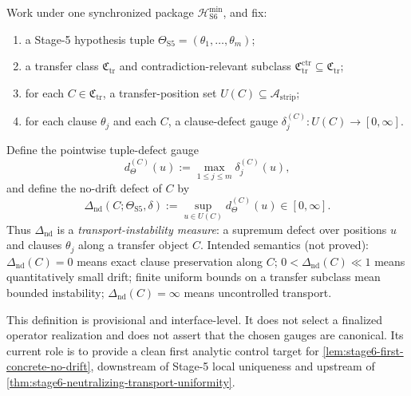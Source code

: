 \begin{definition}
Work under one synchronized package $\mathcal{H}_{\mathrm{S6}}^{\min}$, and fix:
\begin{enumerate}
  \item a Stage-5 hypothesis tuple $\Theta_{\mathrm{S5}}=(\theta_1,\dots,\theta_m)$;
  \item a transfer class $\mathfrak{C}_{\mathrm{tr}}$ and contradiction-relevant subclass
  $\mathfrak{C}_{\mathrm{tr}}^{\mathrm{ctr}}\subseteq\mathfrak{C}_{\mathrm{tr}}$;
  \item for each $C\in\mathfrak{C}_{\mathrm{tr}}$, a transfer-position set $U(C)\subseteq\mathcal{A}_{\mathrm{strip}}$;
  \item for each clause $\theta_j$ and each $C$, a clause-defect gauge
  $\delta_j^{(C)}:U(C)\to[0,\infty]$.
\end{enumerate}
Define the pointwise tuple-defect gauge
\[
d_{\Theta}^{(C)}(u):=\max_{1\le j\le m}\delta_j^{(C)}(u),
\]
and define the no-drift defect of $C$ by
\[
\Delta_{\mathrm{nd}}(C;\Theta_{\mathrm{S5}},\delta):=
\sup_{u\in U(C)}d_{\Theta}^{(C)}(u)\in[0,\infty].
\]
Thus $\Delta_{\mathrm{nd}}$ is a \emph{transport-instability measure}: a supremum defect over positions $u$ and clauses $\theta_j$ along a transfer object $C$.
Intended semantics (not proved): $\Delta_{\mathrm{nd}}(C)=0$ means exact clause preservation along $C$; $0<\Delta_{\mathrm{nd}}(C)\ll1$ means quantitatively small drift; finite uniform bounds on a transfer subclass mean bounded instability; $\Delta_{\mathrm{nd}}(C)=\infty$ means uncontrolled transport.
\end{definition}

\begin{remark}
This definition is provisional and interface-level.
It does not select a finalized operator realization and does not assert that the chosen gauges are canonical.
Its current role is to provide a clean first analytic control target for \cref{lem:stage6-first-concrete-no-drift}, downstream of Stage-5 local uniqueness and upstream of \cref{thm:stage6-neutralizing-transport-uniformity}.
\end{remark}
